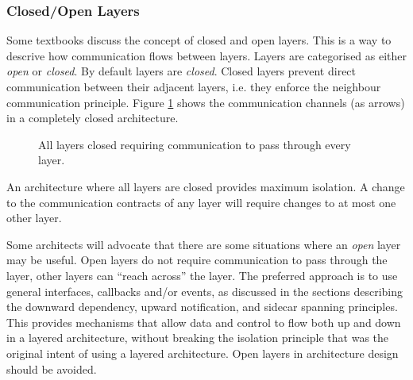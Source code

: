 \subsubsection{Closed/Open Layers}

Some textbooks discuss the concept of closed and open layers.
This is a way to descrive how communication flows between layers.
Layers are categorised as either \textsl{open} or \textsl{closed}.
By default layers are \textsl{closed}.
Closed layers prevent direct communication between their adjacent layers, i.e. they enforce the neighbour communication principle.
Figure \ref{fig:closed-layers} shows the communication channels (as arrows) in a completely closed architecture.

\begin{figure}[ht]
    \centering
    \caption{All layers closed requiring communication to pass through every layer.}
    \label{fig:closed-layers}
\end{figure}

An architecture where all layers are closed provides maximum isolation.
A change to the communication contracts of any layer will require changes to at most one other layer.

Some architects will advocate that there are some situations where an \textsl{open} layer may be useful.
Open layers do not require communication to pass through the layer, other layers can ``reach across'' the layer.
The preferred approach is to use general interfaces, callbacks and/or events, as discussed in the sections describing
the downward dependency, upward notification, and sidecar spanning principles.
This provides mechanisms that allow data and control to flow both up and down in a layered architecture,
without breaking the isolation principle that was the original intent of using a layered architecture.
Open layers in architecture design should be avoided.

